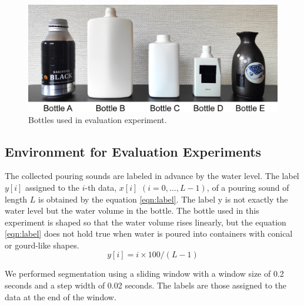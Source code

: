 \documentclass[sigconf]{acmart}
\begin{document}
\begin{figure}[!t]
  \centering
  \includegraphics[width=0.5\linewidth]{figures/bottles.eps}
  \caption{Bottles used in evaluation experiment.}
  \label{fig:bottles}
\end{figure}


\subsection{Environment for Evaluation Experiments}
The collected pouring sounds are labeled in advance by the water level. The label $y[i]$ assigned to the $i$-th data, $x[i]$ $(i=0,\dots, L-1)$, of a pouring sound of length $L$ is obtained by the equation \ref{eqn:label}. The label y is not exactly the water level but the water volume in the bottle. The bottle used in this experiment is shaped so that the water volume rises linearly, but the equation \ref{eqn:label} does not hold true when water is poured into containers with conical or gourd-like shapes.
\begin{equation}
  y[i]=i \times 100/(L-1)
  \label{eqn:label}
\end{equation}

We performed segmentation using a sliding window with a window size of 0.2 seconds and a step width of 0.02 seconds. The labels are those assigned to the data at the end of the window.\par
\end{document}
